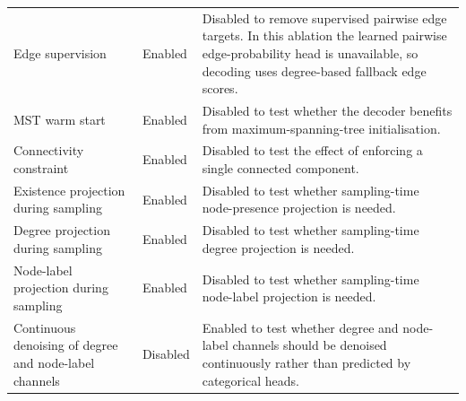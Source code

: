 \begin{xltabular}{\textwidth}{@{}p{0.34\textwidth}p{0.24\textwidth}X@{}}
Edge supervision & Enabled & Disabled to remove supervised pairwise edge targets. In this ablation the learned pairwise edge-probability head is unavailable, so decoding uses degree-based fallback edge scores. \\
MST warm start & Enabled & Disabled to test whether the decoder benefits from maximum-spanning-tree initialisation. \\
Connectivity constraint & Enabled & Disabled to test the effect of enforcing a single connected component. \\
Existence projection during sampling & Enabled & Disabled to test whether sampling-time node-presence projection is needed. \\
Degree projection during sampling & Enabled & Disabled to test whether sampling-time degree projection is needed. \\
Node-label projection during sampling & Enabled & Disabled to test whether sampling-time node-label projection is needed. \\
Continuous denoising of degree and node-label channels & Disabled & Enabled to test whether degree and node-label channels should be denoised continuously rather than predicted by categorical heads. \\
\end{xltabular}

